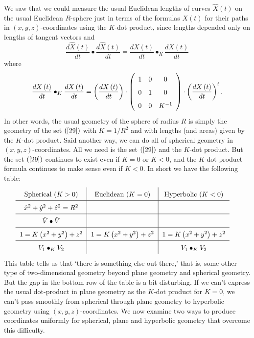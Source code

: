 \documentclass{ximera}
\begin{document}
We saw that we could measure the usual Euclidean lengths of curves $\hat
{X}\left(  t\right)  $ on the usual Euclidean $R$-sphere just in terms of the
formulas $X\left(  t\right)  $ for their paths in $\left(  x,y,z\right)
$-coordinates using the $K$-dot product, since lengths depended only on
lengths of tangent vectors and%
\[
\frac{d\hat{X}\left(  t\right)  }{dt}\bullet\frac{d\hat{X}\left(  t\right)
}{dt}=\frac{dX\left(  t\right)  }{dt}\bullet_{K}\frac{dX\left(  t\right)
}{dt}%
\]
where%
\[
\frac{dX\left(  t\right)  }{dt}\bullet_{K}\frac{dX\left(  t\right)  }%
{dt}=\left(  \frac{dX\left(  t\right)  }{dt}\right)  \cdot\left(
\begin{array}
[c]{ccc}%
1 & 0 & 0\\
0 & 1 & 0\\
0 & 0 & K^{-1}%
\end{array}
\right)  \cdot\left(  \frac{dX\left(  t\right)  }{dt}\right)  ^{t}.
\]
In other words, the usual geometry of the sphere of radius $R$ is simply the
geometry of the set $\left(  \ref{29}\right)  $ with $K=1/R^{2}$ and with
lengths (and areas) given by the $K$-dot product. Said another way, we can do
all of spherical geometry in $\left(  x,y,z\right)  $-coordinates. All we need
is the set $\left(  \ref{29}\right)  $ and the $K$-dot product. But the set
$\left(  \ref{29}\right)  $ continues to exist even if $K=0$ or $K<0$, and the
$K$-dot product formula continues to make sense even if $K<0$. In short we
have the following table:
\begin{equation}%
{\renewcommand{\arraystretch}{1.6}
\begin{tabular}
[c]{c|c|c}%
Spherical ($K>0$) & Euclidean ($K=0$) & Hyperbolic ($K<0$)\\\hline
$\hat{x}^{2}+\hat{y}^{2}+\hat{z}^{2}=R^{2}$ &  & \\\hline
$\hat{V}\bullet\hat{V}$ &  & \\\hline
$1=K\left(  x^{2}+y^{2}\right)  +z^{2}$ & $1=K\left(  x^{2}+y^{2}\right)
+z^{2}$ & $1=K\left(  x^{2}+y^{2}\right)  +z^{2}$\\ \hline
$V_{1}\bullet_{K}V_{2}$ &  & $V_{1}\bullet_{K}V_{2}$%
\end{tabular}}
\ \ \ \ \label{66}%
\end{equation}
This table tells us that `there is something else out there,' that is, some
other type of two-dimensional geometry beyond plane geometry and spherical
geometry. But the gap in the bottom row of the table is a bit disturbing. If
we can't express the usual dot-product in plane geometry as the $K$-dot
product for $K=0$, we can't pass smoothly from spherical through plane
geometry to hyperbolic geometry using $\left(  x,y,z\right)  $-coordinates. We
now examine two ways to produce coordinates uniformly for spherical, plane and
hyperbolic geometry that overcome this difficulty.
\end{document}
